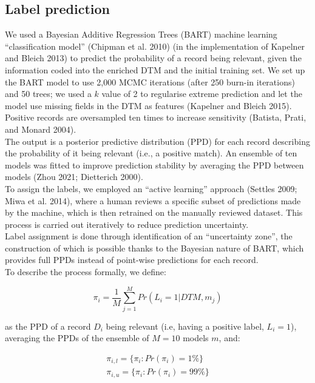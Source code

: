 \documentclass{article}
\begin{document}
\hypertarget{label-prediction}{%
\subsection{Label prediction}\label{label-prediction}}

We used a Bayesian Additive Regression Trees (BART) machine learning
``classification model'' (Chipman et al. 2010) (in the implementation of
Kapelner and Bleich 2013) to predict the probability of a record being
relevant, given the information coded into the enriched DTM and the
initial training set. We set up the BART model to use 2,000 MCMC
iterations (after 250 burn-in iterations) and 50 trees; we used a \(k\)
value of 2 to regularise extreme prediction and let the model use
missing fields in the DTM as features (Kapelner and Bleich 2015).
Positive records are oversampled ten times to increase sensitivity
(Batista, Prati, and Monard 2004).\\
The output is a posterior predictive distribution (PPD) for each record
describing the probability of it being relevant (i.e., a positive
match). An ensemble of ten models was fitted to improve prediction
stability by averaging the PPD between models (Zhou 2021; Dietterich
2000).\\

To assign the labels, we employed an ``active learning'' approach
(Settles 2009; Miwa et al. 2014), where a human reviews a specific
subset of predictions made by the machine, which is then retrained on
the manually reviewed dataset. This process is carried out iteratively
to reduce prediction uncertainty.\\
Label assignment is done through identification of an ``uncertainty
zone'', the construction of which is possible thanks to the Bayesian
nature of BART, which provides full PPDs instead of point-wise
predictions for each record.\\
To describe the process formally, we define:

\[\pi_i = \frac{1}{M}\sum_{j=1}^M Pr(L_i = \text{1}|DTM,m_j)\]

as the PPD of a record \(D_i\) being relevant (i.e, having a positive
label, \(L_i = 1\)), averaging the PPDs of the ensemble of \(M=10\)
models \(m\), and:

\[
\begin{aligned}
\pi_{i,l} = \{\pi_i : Pr(\pi_i) = 1\%\}\\
\pi_{i,u} = \{\pi_i : Pr(\pi_i) = 99\%\}
\end{aligned}
\]
\end{document}
